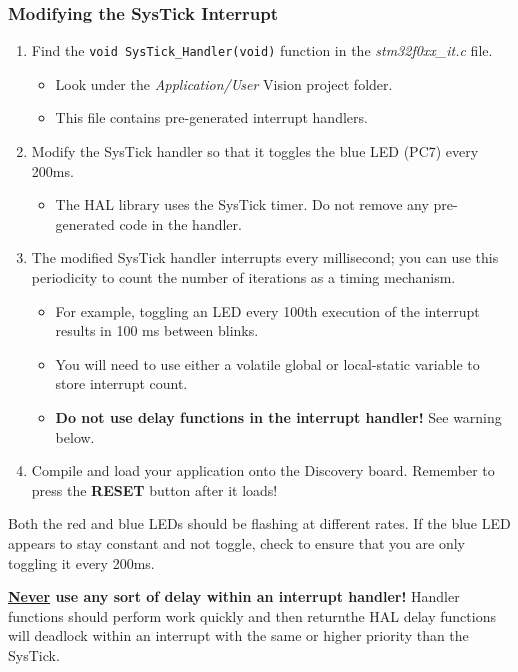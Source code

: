 \documentclass[11pt,fleqn]{book} %
\begin{document}
\begin{exercise}
    \subsubsection{Modifying the SysTick Interrupt}
    \begin{enumerate}
        \item Find the \texttt{void SysTick\_Handler(void)} function in the \textit{stm32f0xx\_it.c} file. 
        \begin{itemize}
            \item Look under the \textit{Application/User} {\textmu}Vision project folder. 
            \item This file contains pre-generated interrupt handlers. 
        \end{itemize}
        \item Modify the SysTick handler so that it toggles the blue LED (PC7) every 200ms. 
        \begin{itemize}
            \item The HAL library uses the SysTick timer. Do not remove any pre-generated code in the handler.
        \end{itemize}
        \item The modified SysTick handler interrupts every millisecond; you can use this periodicity to count the number of iterations as a timing mechanism.
        \begin{itemize}
            \item For example, toggling an LED every 100th execution of the interrupt results in 100 ms between blinks.
            \item You will need to use either a volatile global or local-static variable to store interrupt count.
            \item \textbf{Do not use delay functions in the interrupt handler!} See warning below.
        \end{itemize}
    \item Compile and load your application onto the Discovery board. Remember to press the \textbf{RESET} button after it loads!
    \end{enumerate}

     Both the red and blue LEDs should be flashing at different rates. If the blue LED appears to stay constant and not toggle, check to ensure that you are only toggling it every 200ms.
\end{exercise}

\begin{warning}
    \textbf{\underline{Never} use any sort of delay within an interrupt handler!} Handler functions should perform work quickly and then return\textemdash the HAL delay functions will deadlock within an interrupt with the same or higher priority than the SysTick.
\end{warning}
\end{document}
